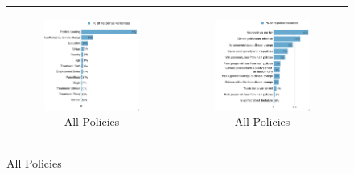 \documentclass{article}
\begin{document}
\begin{figure}[h!]
\begin{center}
	\caption{All Policies and Willingness to change}
	\caption*{Variance decomposition LMG}
	\setlength\extrarowheight{-1pt}
	\begin{tabular}{cc}
		\begin{subfigure}{0.5\textwidth}
		\caption{All Policies}
			\includegraphics[width=\textwidth]{lmg_all_policies_socio_non_standardized}
		\end{subfigure}&
		\begin{subfigure}{0.5\textwidth}
		\caption{All Policies}
			\includegraphics[width=\textwidth]{lmg_all_policies_indices_non_standardized}
		\end{subfigure}\\
	\end{tabular}


\end{center}
\end{figure}
\end{document}
